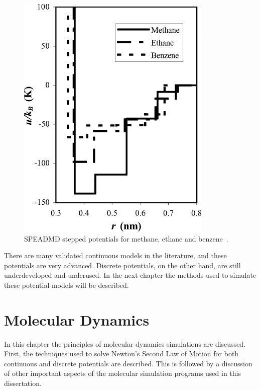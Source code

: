 \documentclass[12pt]{UoAthesis} \usepackage{booktabs}
\begin{document}
\begin{figure}[htp] 
  \begin{center}
    \includegraphics[clip,scale = 1.2]{figures/SPEADMD} 
    \caption [SPEADMD stepped potentials for methane, ethane and benzene]
    {\label{fig:SPEADMD} SPEADMD stepped potentials for methane,
      ethane and benzene~\cite{ElliotJr2002}.}
  \end{center}
\end{figure}

There are many validated continuous models in the literature, and
these potentials are very advanced.  Discrete potentials, on the other
hand, are still underdeveloped and underused. In the next chapter the
methods used to simulate these potential models will be described.
%
%
%
\printbibliography[heading=thesisChapterBib] 


\chapter{Molecular Dynamics}

In this chapter the principles of molecular dynamics simulations are
discussed. First, the techniques used to solve Newton's Second Law of
Motion for both continuous and discrete potentials are described.
This is followed by a discussion of other important aspects of the
molecular simulation programs used in this dissertation.
\end{document}
